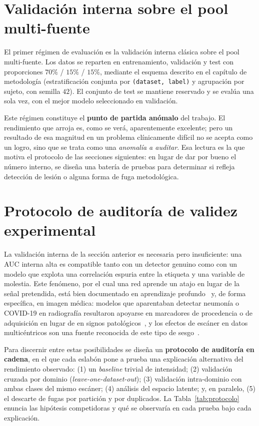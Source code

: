 \section{Validación interna sobre el pool multi-fuente}

El primer régimen de evaluación es la validación interna clásica sobre el pool
multi-fuente. Los datos se reparten en entrenamiento, validación y test con
proporciones $70\%$ / $15\%$ / $15\%$, mediante el esquema descrito en el
capítulo de metodología (estratificación conjunta por \texttt{(dataset, label)}
y agrupación por sujeto, con semilla $42$). El conjunto de test se mantiene
reservado y se evalúa una sola vez, con el mejor modelo seleccionado en
validación.

Este régimen constituye el \textbf{punto de partida anómalo} del trabajo. El
rendimiento que arroja es, como se verá, aparentemente excelente; pero un
resultado de esa magnitud en un problema clínicamente difícil no se acepta como
un logro, sino que se trata como una \emph{anomalía a auditar}. Esa lectura es
la que motiva el protocolo de las secciones siguientes: en lugar de dar por
bueno el número interno, se diseña una batería de pruebas para determinar si
refleja detección de lesión o alguna forma de fuga metodológica.

\section{Protocolo de auditoría de validez experimental}

La validación interna de la sección anterior es necesaria pero insuficiente:
una AUC interna alta es compatible tanto con un detector genuino como con un
modelo que explota una correlación espuria entre la etiqueta y una variable de
molestia. Este fenómeno, por el cual una red aprende un atajo en lugar de la
señal pretendida, está bien documentado en aprendizaje
profundo~\cite{geirhos2020shortcut} y, de forma específica, en imagen médica:
modelos que aparentaban detectar neumonía o COVID-19 en radiografía resultaron
apoyarse en marcadores de procedencia o de adquisición en lugar de en signos
patológicos~\cite{zech2018pneumonia,degrave2021shortcuts}, y los efectos de
escáner en datos multicéntricos son una fuente reconocida de este tipo de
sesgo~\cite{glocker2019scanner,castro2020causality}.

Para discernir entre estas posibilidades se diseña un \textbf{protocolo de
auditoría en cadena}, en el que cada eslabón pone a prueba una explicación
alternativa del rendimiento observado: (1) un \emph{baseline} trivial de
intensidad; (2) validación cruzada por dominio (\emph{leave-one-dataset-out});
(3) validación intra-dominio con ambas clases del mismo escáner; (4) análisis
del espacio latente; y, en paralelo, (5) el descarte de fugas por partición y
por duplicados. La Tabla~\ref{tab:protocolo} enuncia las hipótesis competidoras
y qué se observaría en cada prueba bajo cada explicación.

